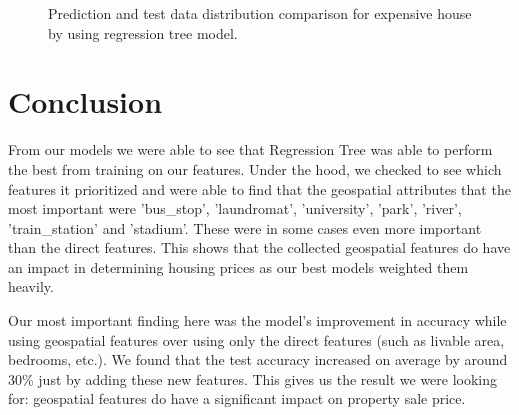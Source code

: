 \documentclass[11pt,a4paper]{article}
\begin{document}
\begin{figure}[h]
    \centering
    \hfill%
    \caption{Prediction and test data distribution comparison for expensive house by using regression tree model.}
    \label{fig:regtreemexpensive}
\end{figure}



\FloatBarrier



\section{Conclusion}

From our models we were able to see that Regression Tree was able to perform the best from training on our features. Under the hood, we checked to see which features it prioritized and were able to find that the geospatial attributes that the most important were 'bus\_stop', 'laundromat', 'university', 'park', 'river', 'train\_station' and 'stadium'. These were in some cases even more important than the direct features. This shows that the collected geospatial features do have an impact in determining housing prices as our best models weighted them heavily.

\medskip

Our most important finding here was the model's improvement in accuracy while using geospatial features over using only the direct features (such as livable area, bedrooms, etc.). We found that the test accuracy increased on average by around 30\% just by adding these new features. This gives us the result we were looking for: geospatial features do have a significant impact on property sale price. 
\end{document}
